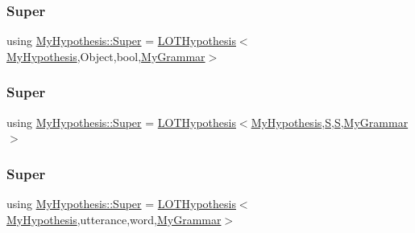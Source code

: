 \mbox{\label{class_my_hypothesis_af34a1c11e5b0aae4a52b54bfdd7a0617}} 
\subsubsection{\texorpdfstring{Super}{Super}\hspace{0.1cm}{\footnotesize\ttfamily [2/5]}}
{\footnotesize\ttfamily using \hyperlink{class_my_hypothesis_a266742f266abc638ddc1d1870d735313}{My\+Hypothesis\+::\+Super} =  \hyperlink{class_l_o_t_hypothesis}{L\+O\+T\+Hypothesis}$<$\hyperlink{class_my_hypothesis}{My\+Hypothesis},Object,bool,\hyperlink{class_my_grammar}{My\+Grammar}$>$}

\mbox{\label{class_my_hypothesis_ae5fab2ea7ef7729968ac60a2ce267168}} 
\subsubsection{\texorpdfstring{Super}{Super}\hspace{0.1cm}{\footnotesize\ttfamily [3/5]}}
{\footnotesize\ttfamily using \hyperlink{class_my_hypothesis_a266742f266abc638ddc1d1870d735313}{My\+Hypothesis\+::\+Super} =  \hyperlink{class_l_o_t_hypothesis}{L\+O\+T\+Hypothesis}$<$\hyperlink{class_my_hypothesis}{My\+Hypothesis},\hyperlink{_formal_language_theory-_complex_2_main_8cpp_a51c40915539205f0b5add30b0d68a4cb}{S},\hyperlink{_formal_language_theory-_complex_2_main_8cpp_a51c40915539205f0b5add30b0d68a4cb}{S},\hyperlink{class_my_grammar}{My\+Grammar}$>$}

\mbox{\label{class_my_hypothesis_a1c1cfa95f1a49b273f8a93b3246342e6}} 
\subsubsection{\texorpdfstring{Super}{Super}\hspace{0.1cm}{\footnotesize\ttfamily [4/5]}}
{\footnotesize\ttfamily using \hyperlink{class_my_hypothesis_a266742f266abc638ddc1d1870d735313}{My\+Hypothesis\+::\+Super} =  \hyperlink{class_l_o_t_hypothesis}{L\+O\+T\+Hypothesis}$<$\hyperlink{class_my_hypothesis}{My\+Hypothesis},utterance,word,\hyperlink{class_my_grammar}{My\+Grammar}$>$}

